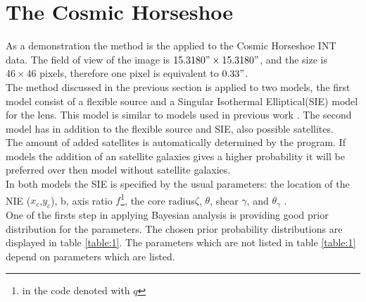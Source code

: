 \documentclass[useAMS,usenatbib]{mn2e}
\begin{document}
\section{The Cosmic Horseshoe}
As a demonstration the method is the applied to the Cosmic Horseshoe INT data. 
The field of view of the image is $15.3180" \times 15.3180"$, and the size is $46 \times 46$ pixels, therefore one pixel is equivalent to $0.33"$. \\
The method discussed  in the previous section is applied to two models, the first model consist of a flexible source and a Singular Isothermal Elliptical(SIE) model for the lens.  This model is similar to models used in previous work \cite{Belokurov2007} \cite{Dye2008}. 
The second model has in addition to the flexible source and SIE, also possible satellites. \\
The amount of added satellites is automatically determined by the program. If models the addition of an satellite galaxies gives a higher probability it will be preferred over then model without satellite galaxies.  \\
In both models the SIE is specified by the usual parameters: the location of the NIE ($x_c$,$y_c$), b, axis ratio $f$\footnote{in the code denoted with $q$},  the core radius$\zeta$, $\theta$, shear $\gamma$, and $\theta_{\gamma}$ \cite{kormann_schneider_1994}.\\
One of the firsts step in applying Bayesian analysis is providing good prior distribution for the parameters. 
The chosen prior probability distributions are displayed in table \ref{table:1}. The parameters which are not listed in table 
\ref{table:1} depend on parameters which are listed. 
\end{document}
